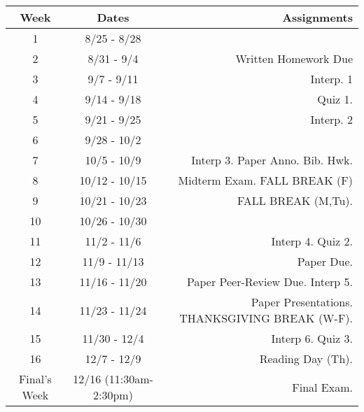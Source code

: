 \documentclass[10pt]{article}
\begin{document}
\begin{center}
\begin{tabular}{|c|c|r|}
\hline 
Week & Dates & Assignments \\
\hline
1 & 8/25 - 8/28 &  \\
\hline 
2 & 8/31 - 9/4 &  Written Homework Due  \\
\hline
3 & 9/7 - 9/11 &   Interp. 1 \\
\hline
4 & 9/14 - 9/18 &   Quiz 1. \\
\hline
5 & 9/21 - 9/25 &  Interp. 2\\
\hline
6 & 9/28 - 10/2 & \\
\hline
7 & 10/5 - 10/9  &  Interp 3. Paper Anno. Bib. Hwk. \\
\hline 
8 & 10/12 - 10/15 & Midterm Exam.  FALL BREAK (F) \\
\hline
9 & 10/21 - 10/23 & FALL BREAK (M,Tu). \\
\hline
10 & 10/26 - 10/30 &  \\
\hline
11 & 11/2 - 11/6 & Interp 4. Quiz 2.\\
\hline
12 & 11/9 - 11/13 &  Paper Due.\\
\hline
13 & 11/16 - 11/20 & Paper Peer-Review Due. Interp 5.\\
\hline
14 & 11/23 - 11/24 &  Paper Presentations. THANKSGIVING BREAK (W-F).   \\
\hline
15 & 11/30 - 12/4 & Interp 6. Quiz 3. \\ 
\hline
16 & 12/7 - 12/9 &   Reading Day (Th). \\
\hline
Final's Week & 12/16 (11:30am-2:30pm) & Final Exam. \\ 
\hline
\end{tabular}
\end{center}
\end{document}
